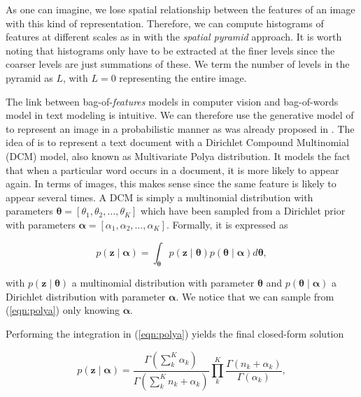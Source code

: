 As one can imagine, we lose spatial relationship between the features of an
image with this kind of representation. Therefore, we can compute histograms of
features at different scales as in \cite{lazebnik06beyond} with the
\emph{spatial pyramid} approach. It is worth noting that histograms only have to
be extracted at the finer levels since the coarser levels are just summations of
these. We term the number of levels in the pyramid as $L$, with $L=0$
representing the entire image.

The link between bag-of-\emph{features} models in computer vision and
bag-of-words model in text modeling is intuitive. We can therefore use
the generative model of \cite{madsen05modeling} to represent an image
in a probabilistic manner as was already proposed in
\cite{ranganathan09bayesian}.  The idea of \cite{madsen05modeling} is
to represent a text document with a Dirichlet Compound Multinomial
(DCM) model, also known as Multivariate Polya distribution. It models
the fact that when a particular word occurs in a document, it is more
likely to appear again. In terms of images, this makes sense since the
same feature is likely to appear several times. A DCM is simply a
multinomial distribution with parameters $\boldsymbol{\theta}=
[\theta_1,\theta_2,\dots,\theta_K]$ which have been sampled from a
Dirichlet prior with parameters $\boldsymbol{\alpha}=
[\alpha_1,\alpha_2,\dots,\alpha_K]$. Formally, it is expressed as

\begin{equation}
\label{eqn:polya}
p(\mathbf{z}\mid \boldsymbol{\alpha}) = \int_{\boldsymbol{\theta}} p(\mathbf{z}\mid \boldsymbol{\theta})
  p(\boldsymbol{\theta}\mid \boldsymbol{\alpha})d\boldsymbol{\theta},
\end{equation}

with $p(\mathbf{z}\mid \boldsymbol{\theta})$ a multinomial distribution with
parameter $\boldsymbol{\theta}$ and $p(\boldsymbol{\theta}\mid \boldsymbol{\alpha})$
a Dirichlet distribution with parameter $\boldsymbol{\alpha}$. We notice that we
can sample from (\ref{eqn:polya}) only knowing $\boldsymbol{\alpha}$.

Performing the integration in (\ref{eqn:polya}) yields the final closed-form
solution

\begin{equation}
\label{eqn:polya_integrated}
p(\mathbf{z}\mid \boldsymbol{\alpha}) =
  \frac{\Gamma(\sum_k^K\alpha_k)}{\Gamma(\sum_k^K n_k + \alpha_k)}
  \prod_k^K\frac{\Gamma(n_k+\alpha_k)}{\Gamma(\alpha_k)},
\end{equation}

